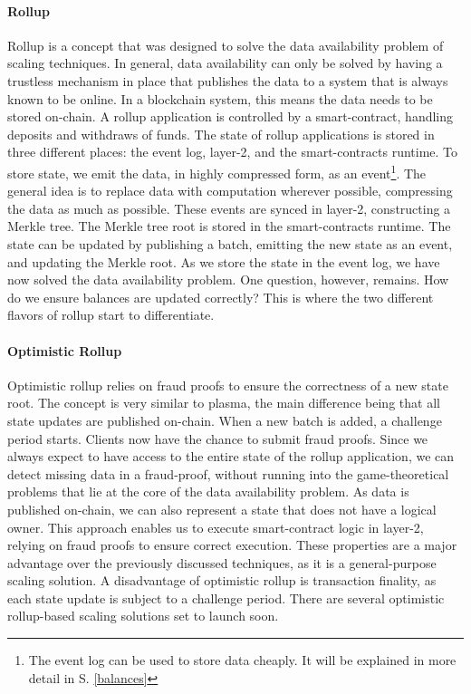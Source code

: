 \documentclass[../../thesis.tex]{subfiles}
\begin{document}
\paragraph{Rollup}
Rollup is a concept that was designed to solve the data availability problem of scaling techniques. In general, data availability can only be solved by having a trustless mechanism in place that publishes the data to a system that is always known to be online. In a blockchain system, this means the data needs to be stored on-chain. A rollup application is controlled by a smart-contract, handling deposits and withdraws of funds. The state of rollup applications is stored in three different places: the event log, layer-2, and the smart-contracts runtime. To store state, we emit the data, in highly compressed form, as an event\footnote{The event log can be used to store data cheaply. It will be explained in more detail in S. \ref{balances}}. The general idea is to replace data with computation wherever possible, compressing the data as much as possible. These events are synced in layer-2, constructing a Merkle tree. The Merkle tree root is stored in the smart-contracts runtime. The state can be updated by publishing a batch, emitting the new state as an event, and updating the Merkle root. As we store the state in the event log, we have now solved the data availability problem. One question, however, remains. How do we ensure balances are updated correctly? This is where the two different flavors of rollup start to differentiate.

\paragraph{Optimistic Rollup}
Optimistic rollup relies on fraud proofs to ensure the correctness of a new state root. The concept is very similar to plasma, the main difference being that all state updates are published on-chain. When a new batch is added, a challenge period starts. Clients now have the chance to submit fraud proofs. Since we always expect to have access to the entire state of the rollup application, we can detect missing data in a fraud-proof, without running into the game-theoretical problems that lie at the core of the data availability problem. As data is published on-chain, we can also represent a state that does not have a logical owner. This approach enables us to execute smart-contract logic in layer-2, relying on fraud proofs to ensure correct execution. These properties are a major advantage over the previously discussed techniques, as it is a general-purpose scaling solution. A disadvantage of optimistic rollup is transaction finality, as each state update is subject to a challenge period. There are several optimistic rollup-based scaling solutions set to launch soon. 
\end{document}

